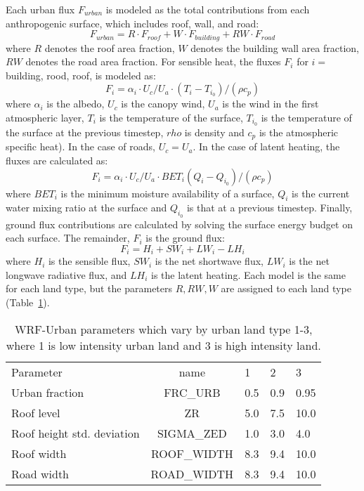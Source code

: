 \documentclass[draft,linenumbers]{agujournal}
\begin{document}
Each urban flux $F_{urban}$ is modeled as the total contributions from each anthropogenic surface, which includes roof, wall, and road: 
\[ F_{urban} = R\cdot F_{roof} + W\cdot F_{building} + RW\cdot F_{road} \]
where $R$ denotes the roof area fraction, $W$ denotes the building wall area fraction, $RW$ denotes the road area fraction. 
For sensible heat, the fluxes $F_i$ for $i=$building, rood, roof, is modeled as: 
\[F_i = \alpha_i\cdot U_c/U_a \cdot \left( T_i - T_{i_0}\right) / \left( \rho c_p \right ) \] 
where $\alpha_i $ is the albedo, $U_c$ is the canopy wind, $U_a$ is the wind in the first atmospheric layer, $T_i$ is the temperature of the surface, $T_{i_0}$ is the temperature of the surface at the previous timestep, $rho$ is density and $c_p$ is the atmospheric specific heat). In the case of roads, $U_c = U_a$.
In the case of latent heating, the fluxes are calculated as: 
\[F_i = \alpha_i \cdot U_c/U_a \cdot BET_i \left( Q_i - Q_{i_0}\right) / \left( \rho c_p \right ) \] 
where $BET_i$ is the minimum moisture availability of a surface, $Q_i$ is the current water mixing ratio at the surface and $Q_{i_0}$ is that at a previous timestep.
Finally, ground flux contributions are calculated by solving the surface energy budget on each surface. The remainder, $F_i$ is the ground flux: 
\[ F_i = H_i +SW_i + LW_i - LH_i\]
where $H_i$ is the sensible flux, $SW_i$ is the net shortwave flux, $LW_i$ is the net longwave radiative flux, and $LH_i$ is the latent heating. 
Each model is the same for each land type, but the parameters $R, RW, W$ are assigned to each land type (Table~\ref{tab:urban_model}). 

\begin{table}
\begin{tabular}{lclll}
Parameter & name & 1 & 2 & 3 \\
Urban fraction &  \textsc{FRC\_URB} & 0.5 & 0.9 & 0.95 \\
Roof level &\textsc{ZR} &5.0&  7.5 & 10.0 \\
Roof height std. deviation & \textsc{SIGMA\_ZED} & 1.0 &  3.0 &  4.0\\
Roof width &  \textsc{ROOF\_WIDTH} & 8.3& 9.4 & 10.0 \\
Road width & \textsc{ROAD\_WIDTH} &  8.3&  9.4&  10.0 
\end{tabular} 
\caption{WRF-Urban parameters which vary by urban land type 1-3, where 1 is low intensity urban land and 3 is high intensity land.}
\label{tab:urban_model}
\end{table}
\end{document}
